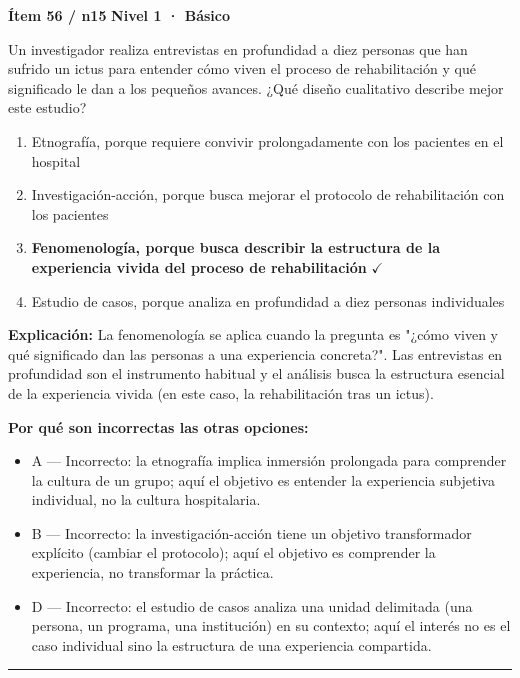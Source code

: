 \documentclass[12pt,a4paper]{article}
\begin{document}
\begin{mdframed}[backgroundcolor=fondogris,linecolor=azul,linewidth=1pt,innerleftmargin=10pt,innerrightmargin=10pt,innertopmargin=7pt,innerbottommargin=7pt]
\textbf{Ítem 56 / n15} \hfill {\small\bfseries\color{azul} Nivel 1 · Básico}
\end{mdframed}

Un investigador realiza entrevistas en profundidad a diez personas que han sufrido un ictus para entender cómo viven el proceso de rehabilitación y qué significado le dan a los pequeños avances. ¿Qué diseño cualitativo describe mejor este estudio?

\begin{enumerate}
  \item[A.] Etnografía, porque requiere convivir prolongadamente con los pacientes en el hospital
  \item[B.] Investigación-acción, porque busca mejorar el protocolo de rehabilitación con los pacientes
  \item[\textbf{\color{verde}C.}] \textbf{\color{verde} Fenomenología, porque busca describir la estructura de la experiencia vivida del proceso de rehabilitación} \hfill $\checkmark$
  \item[D.] Estudio de casos, porque analiza en profundidad a diez personas individuales
\end{enumerate}

\noindent\textbf{\color{azul}Explicación:} La fenomenología se aplica cuando la pregunta es "¿cómo viven y qué significado dan las personas a una experiencia concreta?". Las entrevistas en profundidad son el instrumento habitual y el análisis busca la estructura esencial de la experiencia vivida (en este caso, la rehabilitación tras un ictus).

\noindent\textbf{\color{gris}Por qué son incorrectas las otras opciones:}
\begin{itemize}
  \item {\small A — Incorrecto: la etnografía implica inmersión prolongada para comprender la cultura de un grupo; aquí el objetivo es entender la experiencia subjetiva individual, no la cultura hospitalaria.}
  \item {\small B — Incorrecto: la investigación-acción tiene un objetivo transformador explícito (cambiar el protocolo); aquí el objetivo es comprender la experiencia, no transformar la práctica.}
  \item {\small D — Incorrecto: el estudio de casos analiza una unidad delimitada (una persona, un programa, una institución) en su contexto; aquí el interés no es el caso individual sino la estructura de una experiencia compartida.}
\end{itemize}
\vspace{8pt}\hrule\vspace{10pt}
\end{document}
